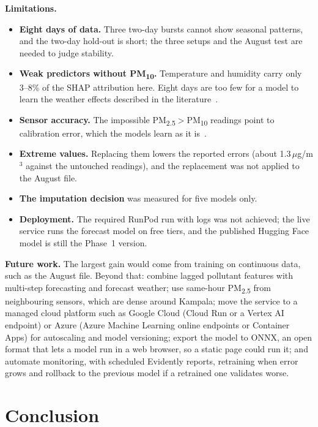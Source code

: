 \documentclass{ieeeaccess}
\newcommand{\ugm}{\,$\mu$g/m$^{3}$}
\newcommand{\pmtwo}{PM\textsubscript{2.5}}
\newcommand{\pmten}{PM\textsubscript{10}}
\begin{document}
\textbf{Limitations.}
\begin{itemize}
\item \textbf{Eight days of data.} Three two-day bursts cannot show seasonal patterns, and the two-day hold-out is short; the three setups and the August test are needed to judge stability.
\item \textbf{Weak predictors without \pmten{}.} Temperature and humidity carry only 3--8\% of the SHAP attribution here. Eight days are too few for a model to learn the weather effects described in the literature~\cite{wangogawa2015,yang2017,wabinyai2026}.
\item \textbf{Sensor accuracy.} The impossible \pmtwo{}$>$\pmten{} readings point to calibration error, which the models learn as it is~\cite{adong2022,lsoto2026}.
\item \textbf{Extreme values.} Replacing them lowers the reported errors (about 1.3\ugm{} against the untouched readings), and the replacement was not applied to the August file.
\item \textbf{The imputation decision} was measured for five models only.
\item \textbf{Deployment.} The required RunPod run with logs was not achieved; the live service runs the forecast model on free tiers, and the published Hugging Face model is still the Phase~1 version.
\end{itemize}

\textbf{Future work.} The largest gain would come from training on continuous data, such as the August file. Beyond that: combine lagged pollutant features with multi-step forecasting and forecast weather; use same-hour \pmtwo{} from neighbouring sensors, which are dense around Kampala; move the service to a managed cloud platform such as Google Cloud (Cloud Run or a Vertex AI endpoint) or Azure (Azure Machine Learning online endpoints or Container Apps) for autoscaling and model versioning; export the model to ONNX, an open format that lets a model run in a web browser, so a static page could run it; and automate monitoring, with scheduled Evidently reports, retraining when error grows and rollback to the previous model if a retrained one validates worse.

\section{Conclusion}
\label{sec:conclusion}
\end{document}
